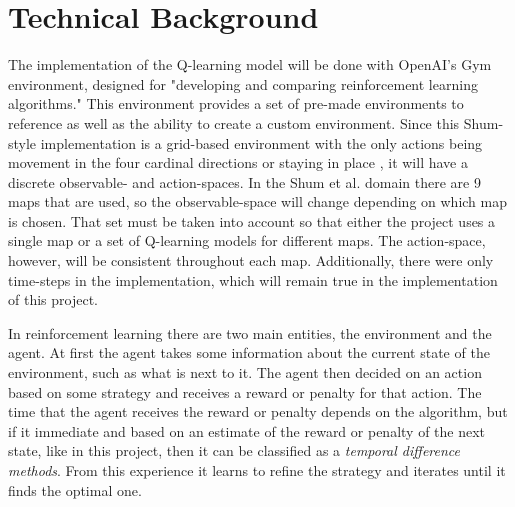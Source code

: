 \documentclass[10pt,twocolumn]{article}
\begin{document}
\section{Technical Background}
\label{SectionTB}

The implementation of the Q-learning model will be done with OpenAI's Gym environment, designed for "developing and comparing reinforcement learning algorithms." \cite{GymDocs, Brockman2016}
This environment provides a set of pre-made environments to reference as well as the ability to create a custom environment.
Since this Shum-style implementation is a grid-based environment with the only actions being movement in the four cardinal directions or staying in place , it will have a discrete observable- and action-spaces.
In the Shum et al. domain there are 9 maps that are used, so the observable-space will change depending on which map is chosen.
That set must be taken into account so that either the project uses a single map or a set of Q-learning models for different maps.
The action-space, however, will be consistent throughout each map.
Additionally, there were only time-steps in the implementation, which will remain true in the implementation of this project.

In reinforcement learning there are two main entities, the environment and the agent.
At first the agent takes some information about the current state of the environment, such as what is next to it.
The agent then decided on an action based on some strategy and receives a reward or penalty for that action.
The time that the agent receives the reward or penalty depends on the algorithm, but if it immediate and based on an estimate of the reward or penalty of the next state, like in this project, then it can be classified as a \textit{temporal difference methods}.
From this experience it learns to refine the strategy and iterates until it finds the optimal one.
\end{document}
